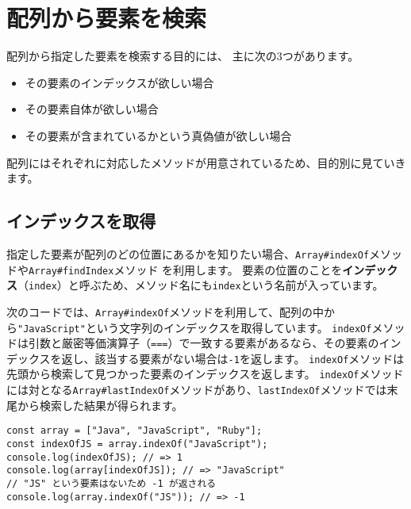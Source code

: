 \hypertarget{search-element}{%
\section{配列から要素を検索}\label{search-element}}

配列から指定した要素を検索する目的には、 主に次の3つがあります。

\begin{itemize}
\item
  その要素のインデックスが欲しい場合
\item
  その要素自体が欲しい場合
\item
  その要素が含まれているかという真偽値が欲しい場合
\end{itemize}

配列にはそれぞれに対応したメソッドが用意されているため、目的別に見ていきます。

\hypertarget{indexof}{%
\subsection{インデックスを取得}\label{indexof}}

指定した要素が配列のどの位置にあるかを知りたい場合、\texttt{Array\#indexOf}メソッドや\texttt{Array\#findIndex}メソッド\,\protect{}\,を利用します。
要素の位置のことを\textbf{インデックス}（\texttt{index}）と呼ぶため、メソッド名にも\texttt{index}という名前が入っています。

次のコードでは、\texttt{Array\#indexOf}メソッドを利用して、配列の中から\texttt{"JavaScript"}という文字列のインデックスを取得しています。
\texttt{indexOf}メソッドは引数と厳密等価演算子（\texttt{===}）で一致する要素があるなら、その要素のインデックスを返し、該当する要素がない場合は\texttt{-1}を返します。
\texttt{indexOf}メソッドは先頭から検索して見つかった要素のインデックスを返します。
\texttt{indexOf}メソッドには対となる\texttt{Array\#lastIndexOf}メソッドがあり、\texttt{lastIndexOf}メソッドでは末尾から検索した結果が得られます。

\begin{lstlisting}
const array = ["Java", "JavaScript", "Ruby"];
const indexOfJS = array.indexOf("JavaScript");
console.log(indexOfJS); // => 1
console.log(array[indexOfJS]); // => "JavaScript"
// "JS" という要素はないため -1 が返される
console.log(array.indexOf("JS")); // => -1
\end{lstlisting}

